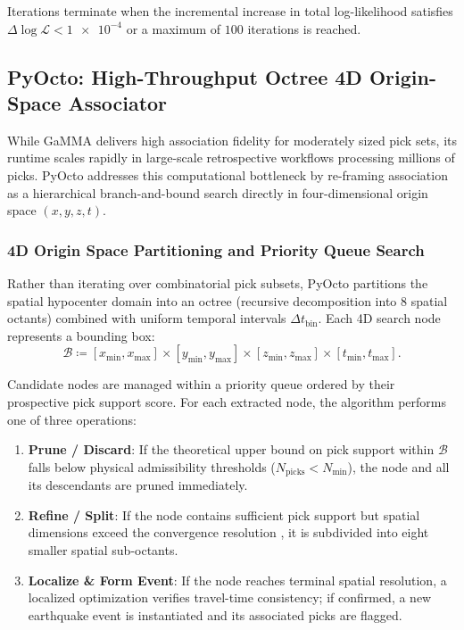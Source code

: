 Iterations terminate when the incremental increase in total
log-likelihood satisfies $\Delta \log \mathcal{L} < \num{1e-4}$ or a
maximum of $\num{100}$ iterations is reached.

\subsection{\ac{PyOcto}: High-Throughput Octree 4D Origin-Space Associator}
While \ac{GaMMA} delivers high association fidelity for moderately sized
pick sets, its runtime scales rapidly in large-scale retrospective
workflows processing millions of picks. \ac{PyOcto}
addresses this computational bottleneck by re-framing association as
a hierarchical branch-and-bound search directly in four-dimensional
origin space $(x, y, z, t)$.

\subsubsection{4D Origin Space Partitioning and Priority Queue Search}
Rather than iterating over combinatorial pick subsets, \ac{PyOcto}
partitions the spatial hypocenter domain into an octree (recursive
decomposition into 8 spatial octants) combined with uniform temporal
intervals $\Delta t_{\mathrm{bin}}$. Each 4D search node represents
a bounding box:
\begin{equation}
  \mathcal{B} \coloneqq [x_{\mathrm{min}}, x_{\mathrm{max}}] \times
  [y_{\mathrm{min}}, y_{\mathrm{max}}] \times [z_{\mathrm{min}},
  z_{\mathrm{max}}] \times [t_{\mathrm{min}}, t_{\mathrm{max}}].
\end{equation}

Candidate nodes are managed within a priority queue ordered by their
prospective pick support score. For each extracted node, the
algorithm performs one of three operations:
\begin{enumerate}
  \item \textbf{Prune / Discard}: If the theoretical upper bound on
    pick support within $\mathcal{B}$ falls below physical
    admissibility thresholds ($N_{\mathrm{picks}} <
    N_{\mathrm{min}}$), the node and all its descendants are pruned
    immediately.
  \item \textbf{Refine / Split}: If the node contains sufficient
    pick support but spatial dimensions exceed the convergence
    resolution , it is
    subdivided into eight smaller spatial sub-octants.
  \item \textbf{Localize \& Form Event}: If the node reaches
    terminal spatial resolution, a localized optimization verifies
    travel-time consistency; if confirmed, a new earthquake event is
    instantiated and its associated picks are flagged.
\end{enumerate}

